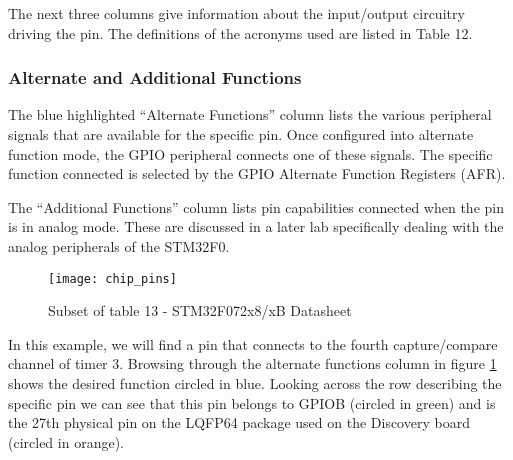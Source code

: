 \documentclass[11pt,fleqn]{book} %
\begin{document}
   The next three columns give information about the input/output circuitry driving the pin. The definitions of the acronyms used are listed in Table 12. 
    
    \subsubsection{Alternate and Additional Functions}
    The blue highlighted ``Alternate Functions'' column lists the various peripheral signals that are available for the specific pin. Once configured into alternate function mode, the GPIO peripheral connects one of these signals. The specific function connected is selected by the GPIO Alternate Function Registers (AFR).
    
    The ``Additional Functions'' column lists pin capabilities connected when the pin is in analog mode. These are discussed in a later lab specifically dealing with the analog peripherals of the STM32F0.


%    
    \begin{figure}[]
        \centering\texttt{[image: chip\_pins]}
        \caption{Subset of table 13 - STM32F072x8/xB Datasheet}
        \label{chip_pins}
    \end{figure}

    \begin{example}
            In this example, we will find a pin that connects to the fourth capture/compare channel of timer 3. Browsing through the alternate functions column in figure \ref{chip_pins} shows the desired function circled in blue. Looking across the row describing the specific pin we can see that this pin belongs to GPIOB (circled in green) and is the 27th physical pin on the LQFP64 package used on the Discovery board (circled in orange).
        
    \end{example}
    
\end{document}
